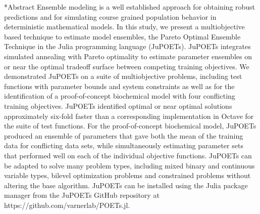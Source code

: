 \documentclass[12pt]{article}
\makeatletter
\renewcommand\section{\@startsection
	{subsection}{2}{0mm}
	{-0.2in}
	{0.05\baselineskip}
	{\normalfont\large\bfseries}}
\makeatother
\begin{document}
\section*{Abstract} %
Ensemble modeling is a well established approach for obtaining robust predictions and for simulating course grained population behavior in deterministic mathematical models.
In this study, we present a multiobjective based technique to estimate model ensembles, the Pareto Optimal Ensemble Technique in the Julia programming language (JuPOETs).
JuPOETs integrates simulated annealing with Pareto optimality to estimate parameter ensembles on or near the optimal tradeoff surface between competing training objectives.
We demonstrated JuPOETs on a suite of multiobjective problems, including test functions with parameter bounds and system constraints as well as for the identification of a proof-of-concept biochemical model with four conflicting training objectives.
JuPOETs identified optimal or near optimal solutions approximately six-fold faster than a corresponding implementation in Octave for the suite of test functions.
For the proof-of-concept biochemical model, JuPOETs produced an ensemble of parameters that gave both the mean of the training data for conflicting data sets,
while simultaneously estimating parameter sets that performed well on each of the individual objective functions.
JuPOETs can be adapted to solve many problem types, including mixed binary and continuous variable types, bilevel optimization problems
and constrained problems without altering the base algorithm.
JuPOETs can be installed using the Julia package manager from the JuPOETs GitHub repository at https://github.com/varnerlab/POETs.jl.

\clearpage

\linenumbers
\end{document}
